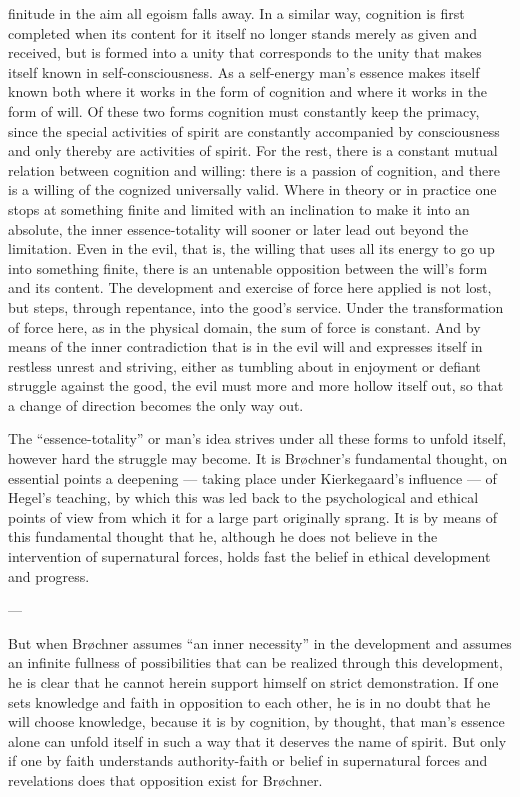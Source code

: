 \documentclass[12pt,a4paper]{book}
\newcommand{\opage}[1]{\marginnote{\footnotesize\textit{[#1]}}}
\begin{document}
finitude in the aim all egoism falls away. In a similar way, cognition is first completed when its
content for it itself no longer stands merely as given and received, but is formed into a unity
that corresponds to the unity that makes itself known in self-consciousness. As a self-energy
man's essence makes itself known both where it works in the form of cognition and where it works
in the form of will. Of these two forms cognition must constantly keep the primacy, since the
special activities of spirit are constantly accompanied by consciousness and only thereby are
activities of spirit. For the rest, there is a constant mutual relation between cognition and
willing: there is a passion of cognition, and there is a willing of the cognized universally
valid. Where in theory or in practice one stops at something finite and limited with an
inclination to make it into an absolute, the inner essence-totality will sooner or later lead out
beyond the limitation. Even in the evil, that is, the willing that uses all its energy to go up
into something finite, there is an untenable opposition between the will's form and its content.
The development and exercise of force here applied is not lost, but steps, through repentance,
into the good's service. Under the transformation of force \opage{202}here, as in the physical domain, the
sum of force is constant. And by means of the inner contradiction that is in the evil will and
expresses itself in restless unrest and striving, either as tumbling about in enjoyment or defiant
struggle against the good, the evil must more and more hollow itself out, so that a change of
direction becomes the only way out.

The ``essence-totality'' or man's idea strives under all these forms to unfold itself, however
hard the struggle may become. It is Brøchner's fundamental thought, on essential points a
deepening --- taking place under Kierkegaard's influence --- of Hegel's teaching, by which this
was led back to the psychological and ethical points of view from which it for a large part
originally sprang. It is by means of this fundamental thought that he, although he does not
believe in the intervention of supernatural forces, holds fast the belief in ethical development
and progress.

\begin{center}---\end{center}

But when Brøchner assumes ``an inner necessity'' in the development and assumes an infinite
fullness of possibilities that can be realized through this development, he is clear that he
cannot herein support himself on strict demonstration. If one sets knowledge and faith in
opposition to each other, he is in no doubt that he will choose knowledge, because it is by
cognition, by thought, that man's essence alone can unfold itself in such a way that it deserves
the name of spirit. But only if one by faith understands authority-faith or belief in
supernatural forces and revelations does that opposition exist for Brøchner.
\end{document}
